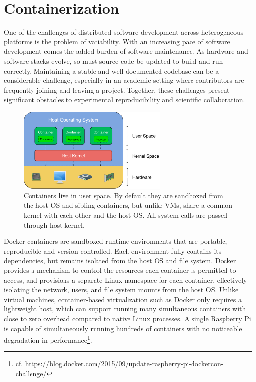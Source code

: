 \documentclass[12pt,initial,twoside,maitrise]{dms}
\numberwithin{equation}{section}
\numberwithin{table}{chapter}
\numberwithin{figure}{chapter}
\begin{document}
\section{Containerization}\label{sec:containerization}

One of the challenges of distributed software development across heterogeneous platforms is the problem of variability. With an increasing pace of software development comes the added burden of software maintenance. As hardware and software stacks evolve, so must source code be updated to build and run correctly. Maintaining a stable and well-documented codebase can be a considerable challenge, especially in an academic setting where contributors are frequently joining and leaving a project. Together, these challenges present significant obstacles to experimental reproducibility and scientific collaboration.

\begin{figure}[ht]
    \centering
    \includegraphics[width=0.65\textwidth]{user_kernel_hardware.png}
    \caption{Containers live in user space. By default they are sandboxed from the host OS and sibling containers, but unlike VMs, share a common kernel with each other and the host OS. All system calls are passed through host kernel.}
    \label{fig:user_kernel_hardware}
\end{figure}

Docker containers are sandboxed runtime environments that are portable, reproducible and version controlled. Each environment fully contains its dependencies, but remains isolated from the host OS and file system. Docker provides a mechanism to control the resources each container is permitted to access, and provisions a separate Linux namespace for each container, effectively isolating the network, users, and file system mounts from the host OS. Unlike virtual machines, container-based virtualization such as Docker only requires a lightweight host, which can support running many simultaneous containers with close to zero overhead compared to native Linux processes. A single Raspberry Pi is capable of simultaneously running hundreds of containers with no noticeable degradation in performance\footnote{cf. \url{https://blog.docker.com/2015/09/update-raspberry-pi-dockercon-challenge/}}.
\end{document}
